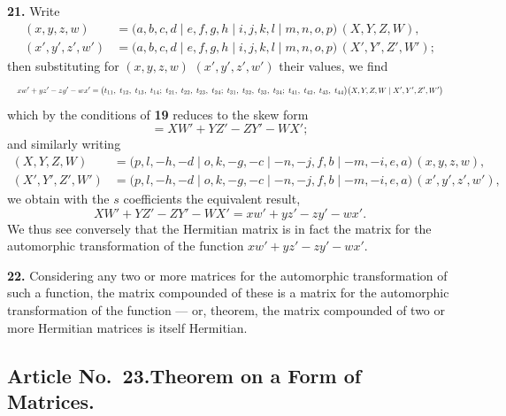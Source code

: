 \documentclass[11pt]{article}
\begin{document}
\textbf{21.} Write
\begin{align*}
(x, y, z, w) &= \bigl(a, b, c, d \mid e, f, g, h \mid i, j, k, l \mid m, n, o, p\bigr)\,(X, Y, Z, W), \\
(x', y', z', w') &= \bigl(a, b, c, d \mid e, f, g, h \mid i, j, k, l \mid m, n, o, p\bigr)\,(X', Y', Z', W');
\end{align*}
then substituting for $(x, y, z, w)$ $(x', y', z', w')$ their values, we find
\[
\resizebox{\textwidth}{!}{$\displaystyle
x w' + y z' - z y' - w x' = \bigl(t_{11},\ t_{12},\ t_{13},\ t_{14};\ t_{21},\ t_{22},\ t_{23},\ t_{24};\ t_{31},\ t_{32},\ t_{33},\ t_{34};\ t_{41},\ t_{42},\ t_{43},\ t_{44}\bigr)\bigl(X, Y, Z, W \mid X', Y', Z', W'\bigr)
$}
\]
which by the conditions of \textbf{19} reduces to the skew form
\[
= X W' + Y Z' - Z Y' - W X';
\]
and similarly writing
\begin{align*}
(X, Y, Z, W) &= \bigl(p, l, -h, -d \mid o, k, -g, -c \mid -n, -j, f, b \mid -m, -i, e, a\bigr)\,(x, y, z, w), \\
(X', Y', Z', W') &= \bigl(p, l, -h, -d \mid o, k, -g, -c \mid -n, -j, f, b \mid -m, -i, e, a\bigr)\,(x', y', z', w'),
\end{align*}
we obtain with the $s$ coefficients the equivalent result,
\[
X W' + Y Z' - Z Y' - W X' = x w' + y z' - z y' - w x'.
\]
We thus see conversely that the Hermitian matrix is in fact the matrix for the automorphic transformation of the function $x w' + y z' - z y' - w x'$.

\textbf{22.} Considering any two or more matrices for the automorphic transformation of such a function, the matrix compounded of these is a matrix for the automorphic transformation of the function --- or, theorem, the matrix compounded of two or more Hermitian matrices is itself Hermitian.

\subsection*{Article No.\ 23.\quad Theorem on a Form of Matrices.}
\end{document}
